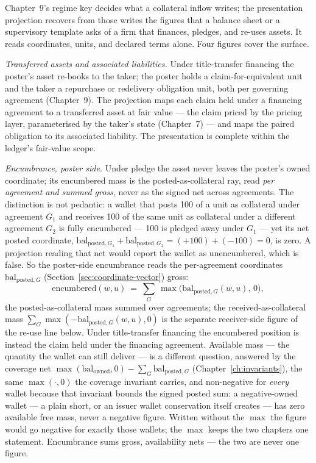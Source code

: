 \documentclass[11pt,a4paper]{article}
\begin{document}
Chapter~9's regime key decides what a collateral inflow writes; the
presentation projection recovers from those writes the figures that a balance
sheet or a supervisory template asks of a firm that finances, pledges, and
re-uses assets. It reads coordinates, units, and declared terms alone. Four
figures cover the surface.

\emph{Transferred assets and associated liabilities.} Under title-transfer
financing the poster's asset re-books to the taker; the poster holds a
claim-for-equivalent unit and the taker a repurchase or redelivery obligation
unit, both per governing agreement (Chapter~9). The projection maps each claim
held under a financing agreement to a transferred asset at fair value --- the
claim priced by the pricing layer, parameterised by the taker's state
(Chapter~7) --- and maps the paired obligation to its associated liability. The
presentation is complete within the ledger's fair-value scope.

\emph{Encumbrance, poster side.} Under pledge the asset never leaves the
poster's owned coordinate; its encumbered mass is the posted-as-collateral ray,
read \emph{per agreement and summed gross}, never as the signed net across
agreements. The distinction is not pedantic: a wallet that posts 100 of a unit as
collateral under agreement $G_1$ and receives 100 of the same unit as collateral
under a different agreement $G_2$ is fully encumbered --- 100 is pledged away under
$G_1$ --- yet its net posted coordinate,
$\mathrm{bal}_{\text{posted},G_1}+\mathrm{bal}_{\text{posted},G_2}=(+100)+(-100)=0$,
is zero. A projection reading that net would report the wallet as unencumbered,
which is false. So the poster-side encumbrance reads the per-agreement coordinates
$\mathrm{bal}_{\text{posted},G}$ (Section~\ref{sec:coordinate-vector})
gross:
\[
\text{encumbered}(w,u)\ =\ \sum_{G}\ \max\bigl(\mathrm{bal}_{\text{posted},G}(w,u),\,0\bigr),
\]
the posted-as-collateral mass summed over agreements; the received-as-collateral
mass $\sum_{G}\max(-\mathrm{bal}_{\text{posted},G}(w,u),0)$ is the separate
receiver-side figure of the re-use line below. Under title-transfer financing the
encumbered position is instead the claim held under the financing agreement.
Available mass --- the quantity the wallet can still deliver --- is a different
question, answered by the coverage net $\max(\mathrm{bal}_{\text{owned}},0)-\sum_G
\mathrm{bal}_{\text{posted},G}$ (Chapter~\ref{ch:invariants}), the same
$\max(\cdot,0)$ the coverage invariant carries, and non-negative for \emph{every}
wallet because that invariant bounds the signed posted sum: a negative-owned wallet ---
a plain short, or an issuer wallet conservation itself creates --- has zero available
free mass, never a negative figure. Written without the $\max$ the figure would go
negative for exactly those wallets; the $\max$ keeps the two chapters one statement.
Encumbrance sums gross, availability nets --- the two are never one figure.
\end{document}
